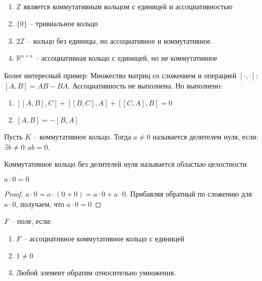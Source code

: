 \documentclass[document.tex]{subfiles}
\begin{document}
\begin{example}
~\begin{enumerate}
\item $\mathbb{Z}$ является коммутативным кольцом с единицей и ассоциативностью
\item $\{0\}$ -- тривиальное кольцо
\item $2\mathbb{Z}$ -- кольцо без единицы, но ассоциативное и коммутативное.
\item $\mathbb{R}^{n \times n}$ -- ассоциативная кольцо с единицей, но не коммутативное
\end{enumerate}
\begin{example}
Более интересный пример:
Множество матриц со сложением и операцией $[\cdot, \cdot]$:
$[A, B] = AB - BA$.
Ассоциативность не выполнена. Но выполнено:
\begin{enumerate}
\item $[[A, B], C] + [[B, C], A] + [[C, A], B] = 0$
\item $[A, B] = -[B, A]$
\end{enumerate}
\end{example}
\end{example}

\begin{definition}
Пусть $K$ -- коммутативное кольцо. Тогда $a \neq 0$ называется делителем нуля, если:
$\exists b \neq 0 : ab = 0$.
\end{definition}

\begin{definition}
Коммутативное кольцо без делителей нуля называется областью целостности.
\end{definition}

\begin{statement}
$a \cdot 0 = 0$
\end{statement}

\begin{proof}
	$a \cdot 0 = a \cdot (0 + 0) = a \cdot 0 + a \cdot 0$. Прибавляя обратный по сложению для $a \cdot 0$, получаем, что $a \cdot 0 = 0$
\end{proof}

\begin{definition}
$F$ -- поле, если:
\begin{enumerate}
\item $F$ -- ассоциативное коммутативное кольцо с единицей
\item $1 \neq 0$
\item Любой элемент обратим относительно умножения.
\end{enumerate}
\end{definition}
\end{document}
